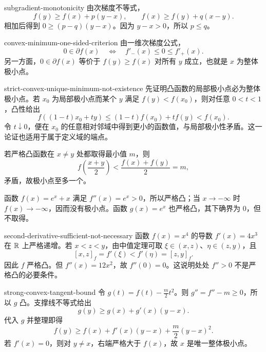 \begin{solution}{subgradient-monotonicity}
由次梯度不等式，
\[
 f(y)\ge f(x)+p(y-x),
 \qquad
 f(x)\ge f(y)+q(x-y).
\]
相加后得到 \(0\ge(p-q)(y-x)\)。因为 \(y-x>0\)，所以 \(p\le q\)。
\end{solution}

\begin{solution}{convex-minimum-one-sided-criterion}
由一维次梯度公式，
\[
 0\in\partial f(x)
 \quad\Longleftrightarrow\quad
 f'_-(x)\le0\le f'_+(x).
\]
另一方面，\(0\in\partial f(x)\) 等价于 \(f(y)\ge f(x)\) 对所有 \(y\) 成立，也就是 \(x\) 为整体极小点。
\end{solution}

\begin{solution}{strict-convex-unique-minimum-not-existence}
先证明凸函数的局部极小点必为整体极小点。若 \(x_0\) 为局部极小点而某个 \(y\) 满足 \(f(y)<f(x_0)\)，则对任意 \(0<t<1\)，凸性给出
\[
 f((1-t)x_0+ty)\le(1-t)f(x_0)+tf(y)<f(x_0).
\]
令 \(t\downarrow0\)，便在 \(x_0\) 的任意相对邻域中得到更小的函数值，与局部极小性矛盾。这一论证也适用于属于定义域的端点。

若严格凸函数在 \(x\ne y\) 处都取得最小值 \(m\)，则
\[
 f\!\left(\frac{x+y}{2}\right)<\frac{f(x)+f(y)}2=m,
\]
矛盾，故极小点至多一个。

函数 \(f(x)=e^x+x\) 满足 \(f''(x)=e^x>0\)，所以严格凸；当 \(x\to-\infty\) 时 \(f(x)\to-\infty\)，因而没有极小点。函数 \(g(x)=e^x\) 也严格凸，其下确界为 \(0\)，但不取得。
\end{solution}

\begin{solution}{second-derivative-sufficient-not-necessary}
函数 \(f(x)=x^4\) 的导数 \(f'(x)=4x^3\) 在 \(\mathbb{R}\) 上严格递增。若 \(x<z<y\)，由中值定理可取 \(\xi\in(x,z)\)、\(\eta\in(z,y)\)，且
\[
 [x,z]_f=f'(\xi)<f'(\eta)=[z,y]_f.
\]
因此 \(f\) 严格凸。但 \(f''(x)=12x^2\)，故 \(f''(0)=0\)。这说明处处 \(f''>0\) 不是严格凸的必要条件。
\end{solution}

\begin{solution}{strong-convex-tangent-bound}
令 \(g(t)=f(t)-\frac m2t^2\)。则 \(g''=f''-m\ge0\)，所以 \(g\) 凸。支撑线不等式给出
\[
 g(y)\ge g(x)+g'(x)(y-x).
\]
代入 \(g\) 并整理即得
\[
 f(y)\ge f(x)+f'(x)(y-x)+\frac m2(y-x)^2.
\]
若 \(f'(x)=0\)，则对 \(y\ne x\)，右端严格大于 \(f(x)\)，故 \(x\) 是唯一整体极小点。
\end{solution}

